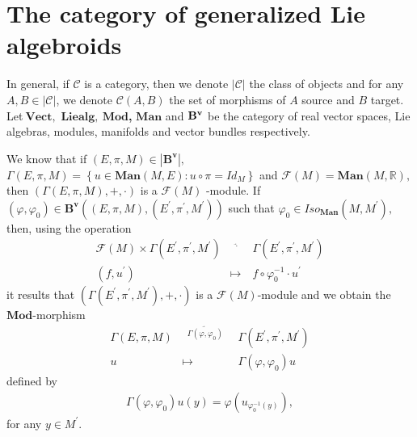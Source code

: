 \documentclass[11pt]{article}
\begin{document}
\section{The category of generalized Lie algebroids}

In general, if $\mathcal{C}$ is a category, then we denote $\left\vert
\mathcal{C}\right\vert $ the class of objects and for any $A,B{\in }%
\left\vert \mathcal{C}\right\vert $, we denote $\mathcal{C}\left( A,B\right)
$ the set of morphisms of $A$ source and $B$ target. Let$\mathbf{~Vect},$ $%
\mathbf{Liealg},~\mathbf{Mod}$\textbf{,} $\mathbf{Man}$ and $\mathbf{B}^{%
\mathbf{v}}$ be the category of real vector spaces, Lie algebras, modules,
manifolds and vector bundles respectively.

We know that if $\left( E,\pi ,M\right) \in \left\vert \mathbf{B}^{\mathbf{v}%
}\right\vert ,$ $\Gamma \left( E,\pi ,M\right) =\left\{ u\in \mathbf{Man}%
\left( M,E\right) :u\circ \pi =Id_{M}\right\} $ and $\mathcal{F}\left(
M\right) =\mathbf{Man}\left( M,\mathbb{R}\right) ,$ then $\left( \Gamma
\left( E,\pi ,M\right) ,+,\cdot \right) $ is a $\mathcal{F}\left( M\right) $%
-module. If \ $\left( \varphi ,\varphi _{0}\right) \in \mathbf{B}^{\mathbf{v}%
}\left( \left( E,\pi ,M\right) ,\left( E^{\prime },\pi ^{\prime },M^{\prime
}\right) \right) $ such that $\varphi _{0}\in Iso_{\mathbf{Man}}\left(
M,M^{\prime }\right) ,$ then, using the operation
\begin{equation*}
\begin{array}{ccc}
\mathcal{F}\left( M\right) \times \Gamma \left( E^{\prime },\pi ^{\prime
},M^{\prime }\right) & ^{\underrightarrow{~\ \ \cdot ~\ \ }} & \Gamma \left(
E^{\prime },\pi ^{\prime },M^{\prime }\right) \\
\left( f,u^{\prime }\right) & \longmapsto & f\circ \varphi _{0}^{-1}\cdot
u^{\prime }%
\end{array}%
\end{equation*}%
it results that $\left( \Gamma \left( E^{\prime },\pi ^{\prime },M^{\prime
}\right) ,+,\cdot \right) $ is a $\mathcal{F}\left( M\right) $-module and we
obtain the $\mathbf{Mod}$-morphism%
\begin{equation*}
\begin{array}{ccc}
\Gamma \left( E,\pi ,M\right) & ^{\underrightarrow{~\ \ \Gamma \left(
\varphi ,\varphi _{0}\right) ~\ \ }} & \Gamma \left( E^{\prime },\pi
^{\prime },M^{\prime }\right) \\
u & \longmapsto & \Gamma \left( \varphi ,\varphi _{0}\right) u%
\end{array}%
\end{equation*}%
defined by
\begin{equation*}
\begin{array}{c}
\Gamma \left( \varphi ,\varphi _{0}\right) u\left( y\right) =\varphi \left(
u_{\varphi _{0}^{-1}\left( y\right) }\right) ,%
\end{array}%
\end{equation*}%
for any $y\in M^{\prime }.$
\end{document}
